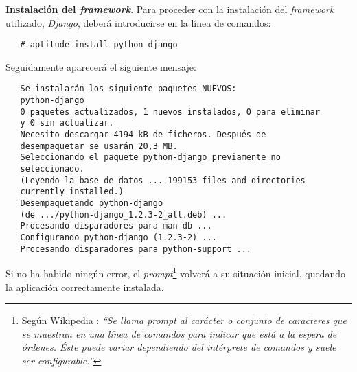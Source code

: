 \item \textbf{Instalación del \textit{framework}}.
   Para proceder con la instalación del \textit{framework} utilizado,
   \textit{Django}, deberá introducirse en la línea de comandos:

   \begin{verbatim}
   # aptitude install python-django
   \end{verbatim}

   Seguidamente aparecerá el siguiente mensaje:

   \begin{verbatim}
   Se instalarán los siguiente paquetes NUEVOS:
   python-django
   0 paquetes actualizados, 1 nuevos instalados, 0 para eliminar
   y 0 sin actualizar.
   Necesito descargar 4194 kB de ficheros. Después de
   desempaquetar se usarán 20,3 MB.
   Seleccionando el paquete python-django previamente no
   seleccionado.
   (Leyendo la base de datos ... 199153 files and directories
   currently installed.)
   Desempaquetando python-django
   (de .../python-django_1.2.3-2_all.deb) ...
   Procesando disparadores para man-db ...
   Configurando python-django (1.2.3-2) ...
   Procesando disparadores para python-support ...
   \end{verbatim}

   Si no ha habido ningún error, el \textit{prompt}\footnote{Según Wikipedia
   \cite{wikipedia2}: \textit{``Se llama prompt al carácter o conjunto de
   caracteres que se muestran en una línea de comandos para indicar que está a
   la espera de órdenes. Éste puede variar dependiendo del intérprete de
   comandos y suele ser configurable.''}} volverá a su situación inicial,
   quedando la aplicación correctamente instalada.